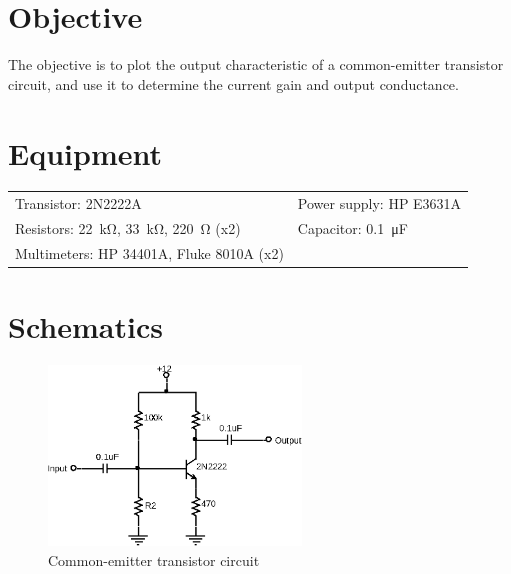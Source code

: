 

\section{Objective}

The objective is to plot the output characteristic of a common-emitter transistor circuit, and use it to determine the current gain and output conductance.

\section{Equipment}

\begin{tabular}{ll}
  \centering
  Transistor: 2N2222A               & Power supply: HP E3631A            \\
  Resistors: \SI{22}{\kilo\ohm}, \SI{33}{\kilo\ohm}, \SI{220}{\ohm} (x2) &   Capacitor: \SI{0.1}{\micro\farad} \\
 Multimeters: HP 34401A, Fluke 8010A (x2) & \\
\end{tabular}

\section{Schematics}

\begin{figure}[hbtp]
  \centering
  \includegraphics[width=0.6\textwidth]{circuit}
  \caption{\label{fig:circuit} Common-emitter transistor circuit}
\end{figure}

